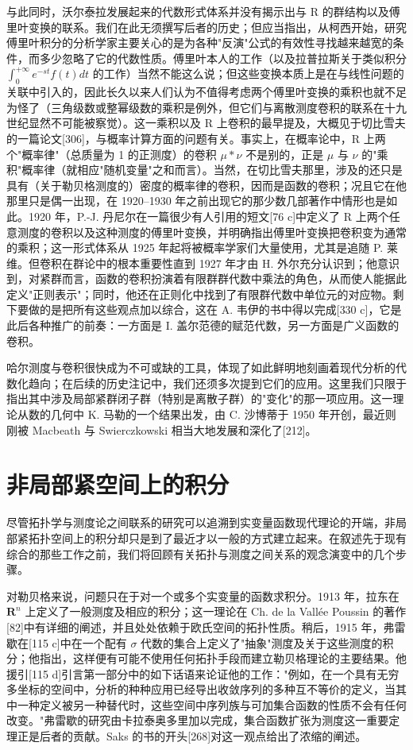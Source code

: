 与此同时，沃尔泰拉发展起来的代数形式体系并没有揭示出与 R 的群结构以及傅里叶变换的联系。我们在此无须撰写后者的历史；但应当指出，从柯西开始，研究傅里叶积分的分析学家主要关心的是为各种"反演"公式的有效性寻找越来越宽的条件，而多少忽略了它的代数性质。傅里叶本人的工作（以及拉普拉斯关于类似积分 \(\int_{0}^{+\infty} e^{-st} f(t) dt\) 的工作）当然不能这么说；但这些变换本质上是在与线性问题的关联中引入的，因此长久以来人们认为不值得考虑两个傅里叶变换的乘积也就不足为怪了（三角级数或整幂级数的乘积是例外，但它们与离散测度卷积的联系在十九世纪显然不可能被察觉）。这一乘积以及 R 上卷积的最早提及，大概见于切比雪夫的一篇论文{[}306{]}，与概率计算方面的问题有关。事实上，在概率论中，R 上两个"概率律"（总质量为 1 的正测度）的卷积 \(\mu * \nu\) 不是别的，正是 \(\mu\) 与 \(\nu\) 的"乘积"概率律（就相应"随机变量"之和而言）。当然，在切比雪夫那里，涉及的还只是具有（关于勒贝格测度的）密度的概率律的卷积，因而是函数的卷积；况且它在他那里只是偶一出现，在 1920–1930 年之前出现它的那少数几部著作中情形也是如此。1920 年，P.-J. 丹尼尔在一篇很少有人引用的短文{[}76 c{]}中定义了 R 上两个任意测度的卷积以及这种测度的傅里叶变换，并明确指出傅里叶变换把卷积变为通常的乘积；这一形式体系从 1925 年起将被概率学家们大量使用，尤其是追随 P. 莱维。但卷积在群论中的根本重要性直到 1927 年才由 H. 外尔充分认识到；他意识到，对紧群而言，函数的卷积扮演着有限群群代数中乘法的角色，从而使人能据此定义"正则表示"；同时，他还在正则化中找到了有限群代数中单位元的对应物。剩下要做的是把所有这些观点加以综合，这在 A. 韦伊的书中得以完成{[}330 c{]}，它是此后各种推广的前奏：一方面是 I. 盖尔范德的赋范代数，另一方面是广义函数的卷积。

哈尔测度与卷积很快成为不可或缺的工具，体现了如此鲜明地刻画着现代分析的代数化趋向；在后续的历史注记中，我们还须多次提到它们的应用。这里我们只限于指出其中涉及局部紧群闭子群（特别是离散子群）的"变化"的那一项应用。这一理论从数的几何中 K. 马勒的一个结果出发，由 C. 沙博蒂于 1950 年开创，最近则刚被 Macbeath 与 Swierczkowski 相当大地发展和深化了{[}212{]}。

\chapter{非局部紧空间上的积分}

尽管拓扑学与测度论之间联系的研究可以追溯到实变量函数现代理论的开端，非局部紧拓扑空间上的积分却只是到了最近才以一般的方式建立起来。在叙述先于现有综合的那些工作之前，我们将回顾有关拓扑与测度之间关系的观念演变中的几个步骤。

对勒贝格来说，问题只在于对一个或多个实变量的函数求积分。1913 年，拉东在 \(\mathbf{R}^n\) 上定义了一般测度及相应的积分；这一理论在 Ch. de la Vallée Poussin 的著作{[}82{]}中有详细的阐述，并且处处依赖于欧氏空间的拓扑性质。稍后，1915 年，弗雷歇在{[}115 c{]}中在一个配有 \(\sigma\) 代数的集合上定义了"抽象"测度及关于这些测度的积分；他指出，这样便有可能不使用任何拓扑手段而建立勒贝格理论的主要结果。他援引{[}115 d{]}引言第一部分中的如下话语来论证他的工作："例如，在一个具有无穷多坐标的空间中，分析的种种应用已经导出收敛序列的多种互不等价的定义，当其中一种定义被另一种替代时，这些空间中序列族与可加集合函数的性质不会有任何改变。"弗雷歇的研究由卡拉泰奥多里加以完成，集合函数扩张为测度这一重要定理正是后者的贡献。Saks 的书的开头{[}268{]}对这一观点给出了浓缩的阐述。

